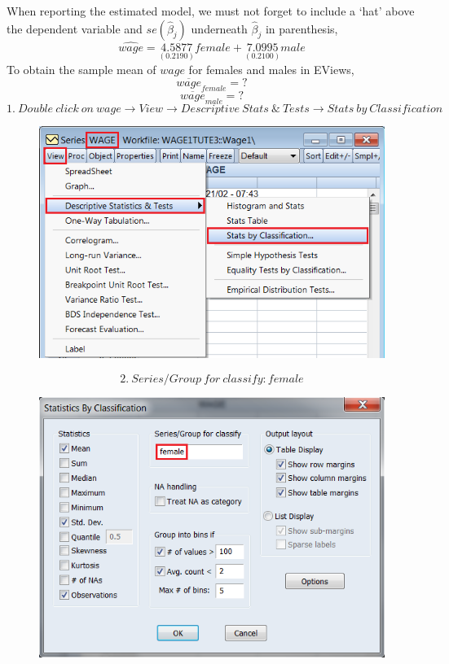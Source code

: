 \documentclass[12pt]{report}
\begin{document}
\vspace{-\baselineskip}
\noindent When reporting the estimated model, we must not forget to include a `hat' above the dependent variable and $se(\hat{\beta}_j)$ underneath $\hat{\beta}_j$ in parenthesis,
$$\widehat{wage} = \underset{(0.2190)}{4.5877}female + \underset{(0.2100)}{7.0995}male$$
\noindent To obtain the sample mean of $wage$ for females and males in EViews,
$$\overline{wage}_{female} = ?$$
$$\overline{wage}_{male} = ?$$
$$1.\ Double\ click\ on\ wage \to View \to Descriptive\ Stats\ \&\ Tests \to Stats\ by\ Classification$$
\begin{figure}[H]
	\centering
	\includegraphics{q2_6}
\end{figure}
\vspace{-\baselineskip}
$$2.\ Series/Group\ for\ classify: female$$
\begin{figure}[H]
	\centering
	\includegraphics{q2_7}
\end{figure}
\end{document}
